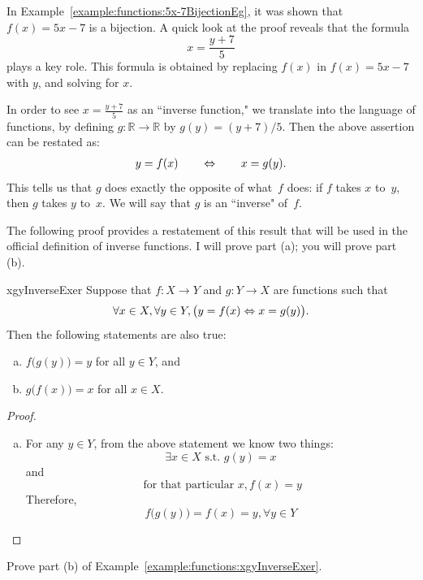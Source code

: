 \begin{example}{}
In Example~\ref{example:functions:5x-7BijectionEg}, it was shown that $f(x) = 5x - 7$ is a bijection. A quick look at the proof reveals that the formula
$$x =  \frac{y+7}{5} $$
plays a key role.  This formula is obtained by replacing $f(x)$ in $f(x) = 5x - 7$ with $y$, and solving for $x$.

In order to see $x = \frac{y+7}{5}$ as an ``inverse function," we translate into the language of functions, by defining $g \colon \mathbb{R} \to \mathbb{R}$  by $g(y) = (y+7)/5$. Then the above assertion can be restated as:
\begin{align*} \label{y=f(x)<>x=g(y)}
 y = f(x) \qquad \Leftrightarrow \qquad x = g(y) .
 \end{align*}
This tells us that $g$ does exactly the opposite of what~$f$ does: if $f$ takes $x$ to~$y$, then $g$ takes $y$ to~$x$. We will say that $g$ is an ``inverse" of~$f$.
\end{example}


The following proof provides a restatement of this result that will be used in the official definition of inverse functions. I will prove part (a); you will prove part (b).

 \begin{example}{xgyInverseExer}
 Suppose  that $f \colon X \to Y$
 and $g \colon Y \to X$ are functions such that
 $$ \forall x \in X, \forall y \in Y, \bigl(y = f(x) \Leftrightarrow x = g(y) \bigr). $$
Then the following statements are also true:
  \begin{enumerate}[(a)]
 \item  \label{x=g(y)->InverseExer-f(g(y))}
 $f \bigl( g(y) \bigr) = y$ for all $y \in Y$,
 and
 \item  \label{x=g(y)->InverseExer-g(f(x))}
 $g \bigl( f(x) \bigr) = x$ for all $x \in X$.
 \end{enumerate}

 
 \begin{proof}
 \begin{enumerate}[(a)]
 \item
For any $y \in Y$, from the above statement we know two things:  
$$\exists x \in X \mbox{ s.t. } g(y) = x$$ 
and
$$\mbox{ for that particular } x, f(x) = y$$
Therefore, 
$$f \bigl( g(y) \bigr) = f(x) = y, \forall y \in Y$$
\end{enumerate}
\end{proof}

\begin{exercise}{88}
Prove part (b) of Example~\ref{example:functions:xgyInverseExer}.
\end{exercise}
 \end{example}

